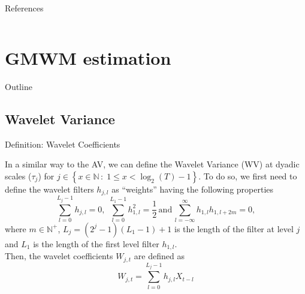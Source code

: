 \documentclass[envcountsect,usenames,dvipsnames]{beamer}
\theoremstyle{mystyle}
\renewcommand*{\bibfont}{\scriptsize}
\begin{document}
\renewcommand*{\bibfont}{\tiny}
\begin{frame}{References}
\begin{columns}
\column{0.85\paperwidth}
\printbibliography[section=4, heading = Ref]
\end{columns}
\end{frame}


\section{GMWM estimation}\newrefsection

\begin{frame}{Outline}
\small
\begin{multicols}{2}
  \tableofcontents[currentsection]
\end{multicols}
\end{frame}

\subsection{Wavelet Variance}

\begin{frame}{Definition: Wavelet Coefficients}

\footnotesize

\begin{Definition}
\label{def:wv.coeffs}

In a similar way to the AV, we can define the Wavelet Variance (WV) at dyadic scales ($\tau_j$) for $j  \in \left\{x \in \mathbb{N} \, : \;  1 \leq x < \log_2 (T) - 1 \right\}$. To do so, we first need to define the wavelet filters $h_{j,l}$ as ``weights'' having the following properties
    \begin{equation*}
     \sum_{l=0}^{L_j-1} h_{j,l}=0, \,\, \sum_{l=0}^{L_1-1} h_{1,l}^2 =\frac{1}{2} \, \mathrm{and } \, \sum_{l=-\infty}^{\infty} h_{1,l}  h_{1,l+2m} = 0 ,
    \label{def:wvfilter}
\end{equation*}
where $m \in \mathbb{N}^+$, $L_j = (2^j-1)(L_1-1)+1$ is the length of the filter at level $j$ and $L_1$ is the length of the first level filter $h_{1,l}$.\\[0.2cm]

Then, the wavelet coefficients $W_{j,t}$ are defined as
%
\begin{equation*}
    W_{j,t} = \sum_{l=0}^{L_j-1}h_{j,l} X_{t-l}
\end{equation*}
%
\end{Definition}

\end{frame}
\end{document}
